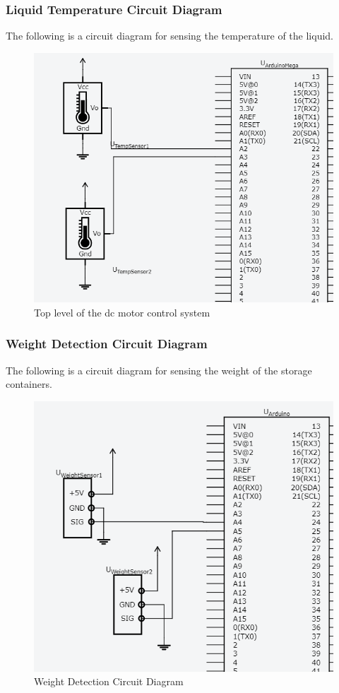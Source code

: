 \documentclass [10pt]{article}
\begin{document}
\subsubsection{Liquid Temperature Circuit Diagram}
The following is a circuit diagram for sensing the temperature of the liquid.
\begin{figure} [h!]
	\centering
	\includegraphics [scale = 0.6] {Figures/TempSensor.png}
	\caption{Top level of the dc motor control system}
\end{figure}


\subsubsection{Weight Detection Circuit Diagram}
The following is a circuit diagram for sensing the weight of the storage containers.
\begin{figure} [h!]
	\centering
	\includegraphics [scale = 0.6] {Figures/WeightSensors.png}
	\caption{Weight Detection Circuit Diagram}
\end{figure}
\end{document}
